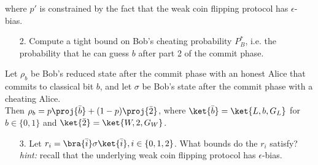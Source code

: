 \begin{exercises}
where $p'$ is constrained by the fact that the weak coin flipping protocol has $\epsilon$-bias.
\begin{enumerate}
\item[2.] Compute a tight bound on Bob's cheating probability $P_B^*$, i.e. the probability that he can guess $b$ after part 2 of the commit phase.
\end{enumerate}
Let $\rho_b$ be Bob's reduced state after the commit phase with an honest Alice that commits to classical bit $b$, and let $\sigma$ be Bob's state after the commit phase with a cheating Alice. \\
Then $\rho_b = p \proj{\bar{b}} + (1-p)\proj{\bar{2}}$, where $\ket{ \bar{b}} = \ket{L,b,G_L}$ for $b \in \{0,1\}$ and $\ket{\bar{2}} = \ket{W,2, G_W} $.
\begin{enumerate}
\item[3.] Let $r_i =  \bra{\bar{i}} \sigma \ket{\bar{i}}, i \in \{0,1,2\}$. What bounds do the $r_i$ satisfy? \textit{hint:} recall that the underlying weak coin flipping protocol has $\epsilon$-bias.

\end{enumerate}
\end{exercises}
